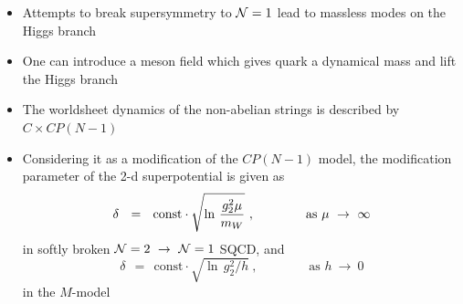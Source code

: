 \documentclass[12pt,letterpaper,landscape,KOMA,smallheadings,calcdimensions,display]{powersem}
\begin{document}
\begin{slide}
\vspace*{\fill}
\begin{itemize}
\item	
	Attempts to break supersymmetry to $ \mathcal{N}=1 $ lead to massless modes on the Higgs branch

\item
	One can introduce a meson field which gives quark a dynamical mass and lift the Higgs branch

\item
	The worldsheet dynamics of the non-abelian strings is described by $ C\times CP(N-1) $
\end{itemize}
\vspace*{\fill}
\end{slide}


\begin{slide}
\begin{itemize}
\item
	Considering it as a modification of the $ CP(N-1) $ model, the modification parameter
	of the 2-d superpotential is given as 
\[
	\delta~~=~~ {\rm const} \cdot \sqrt{\ln\, \frac{g_2^2\mu}{m_W}}~,
	\qquad\qquad \text{as $\mu ~\to~ \infty$}
\]
	in softly broken $\mathcal{N}=2 ~\to~ \mathcal{N}=1 $ SQCD, and
\[
	\delta ~~=~~ \text{const} \cdot \sqrt{\ln\, g_2^2 / h}~,
	\qquad\qquad \text{as $h ~\to~ 0$}
\]
	in the $M$-model
\end{itemize}
\end{slide}
\end{document}
